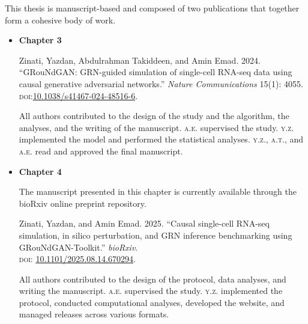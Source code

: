 This thesis is manuscript-based and composed of two publications that together form a cohesive body of work. 
\begin{itemize}
    \item \textbf{\sffamily Chapter 3}
    \begin{tcolorbox}
    Zinati, Yazdan, Abdulrahman Takiddeen, and Amin Emad. 2024. ``GRouNdGAN: GRN-guided simulation of single-cell RNA-seq data using causal generative adversarial networks.'' \textit{Nature Communications} 15(1): 4055.\\\textsc{doi}:\href{https://doi.org/10.1038/s41467-024-48516-6}{10.1038/s41467-024-48516-6}.
    \end{tcolorbox}
    All authors contributed to the design of the study and the algorithm, the analyses, and the writing of the manuscript. \textsc{a.e.} supervised the study. \textsc{y.z.} implemented the model and performed the statistical analyses. \textsc{y.z.}, \textsc{a.t.}, and \textsc{a.e.} read and approved the final manuscript.    

    \item \textbf{\sffamily Chapter 4} 
    
The manuscript presented in this chapter is currently available through the bioRxiv online preprint repository.
    \begin{tcolorbox}
    Zinati, Yazdan, and Amin Emad. 2025. “Causal single-cell RNA-seq simulation, in silico perturbation, and GRN inference benchmarking using GRouNdGAN-Toolkit.” \textit{bioRxiv}. \\\textsc{doi}: \href{https://doi.org/10.1101/2025.08.14.670294}{10.1101/2025.08.14.670294}.
    \end{tcolorbox}
All authors contributed to the design of the protocol, data analyses, and writing the manuscript. \textsc{a.e.} supervised the study. \textsc{y.z.} implemented the protocol, conducted computational analyses, developed the website, and managed releases across various formats.
\end{itemize}
